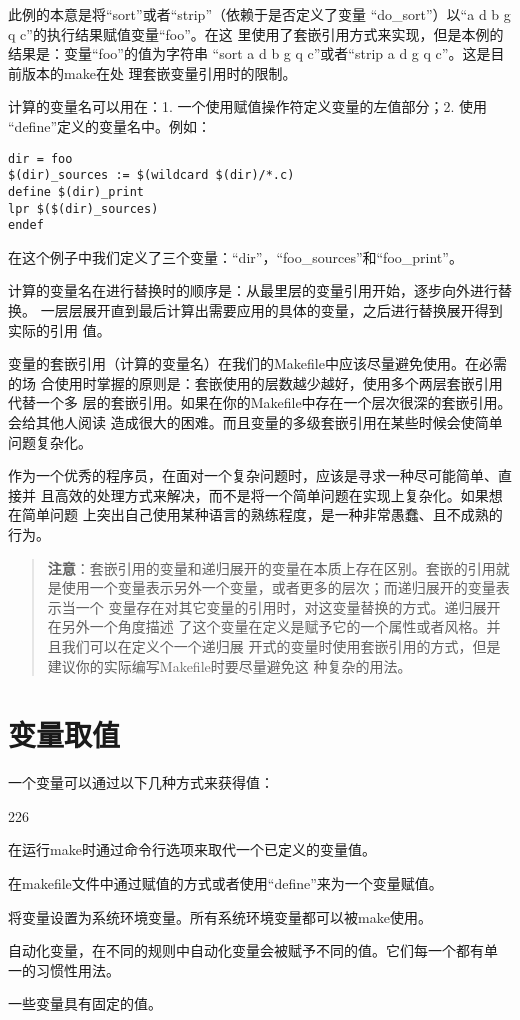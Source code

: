 此例的本意是将“sort”或者“strip”（依赖于是否定义了变量
“do\_sort”）以“a d b g q c”的执行结果赋值变量“foo”。在这
里使用了套嵌引用方式来实现，但是本例的结果是：变量“foo”的值为字符串
“sort a d b g q c”或者“strip a d g q c”。这是目前版本的make在处
理套嵌变量引用时的限制。

计算的变量名可以用在：1. 一个使用赋值操作符定义变量的左值部分；2. 使用
“define”定义的变量名中。例如：

\begin{Verbatim}[]
dir = foo
$(dir)_sources := $(wildcard $(dir)/*.c)
define $(dir)_print
lpr $($(dir)_sources)
endef
\end{Verbatim}
在这个例子中我们定义了三个变量：“dir”，“foo\_sources”和“foo\_print”。

计算的变量名在进行替换时的顺序是：从最里层的变量引用开始，逐步向外进行替换。
一层层展开直到最后计算出需要应用的具体的变量，之后进行替换展开得到实际的引用
值。

变量的套嵌引用（计算的变量名）在我们的Makefile中应该尽量避免使用。在必需的场
合使用时掌握的原则是：套嵌使用的层数越少越好，使用多个两层套嵌引用代替一个多
层的套嵌引用。如果在你的Makefile中存在一个层次很深的套嵌引用。会给其他人阅读
造成很大的困难。而且变量的多级套嵌引用在某些时候会使简单问题复杂化。

作为一个优秀的程序员，在面对一个复杂问题时，应该是寻求一种尽可能简单、直接并
且高效的处理方式来解决，而不是将一个简单问题在实现上复杂化。如果想在简单问题
上突出自己使用某种语言的熟练程度，是一种非常愚蠢、且不成熟的行为。

\begin{quote}\kaishu
\textbf{注意}：套嵌引用的变量和递归展开的变量在本质上存在区别。套嵌的引用就
是使用一个变量表示另外一个变量，或者更多的层次；而递归展开的变量表示当一个
变量存在对其它变量的引用时，对这变量替换的方式。递归展开在另外一个角度描述
了这个变量在定义是赋予它的一个属性或者风格。并且我们可以在定义个一个递归展
开式的变量时使用套嵌引用的方式，但是建议你的实际编写Makefile时要尽量避免这
种复杂的用法。
\end{quote}

\section{变量取值}
一个变量可以通过以下几种方式来获得值：

\begin{dinglist}{226}
\itemsep=4pt \parskip=0pt

\item 在运行make时通过命令行选项来取代一个已定义的变量值。

\item 在makefile文件中通过赋值的方式或者使用“define”来为一个变量赋值。

\item 将变量设置为系统环境变量。所有系统环境变量都可以被make使用。

\item 自动化变量，在不同的规则中自动化变量会被赋予不同的值。它们每一个都有单
    一的习惯性用法。

\item 一些变量具有固定的值。

\end{dinglist}



